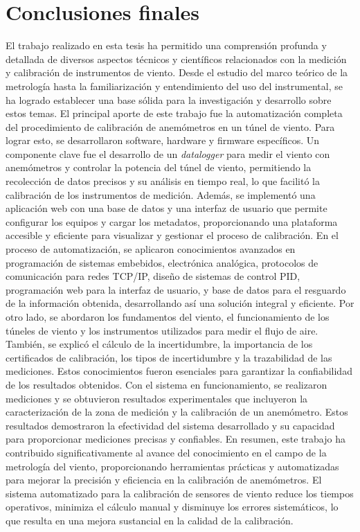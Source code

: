 \section{Conclusiones finales}
El trabajo realizado en esta tesis ha permitido una comprensión profunda y detallada de diversos aspectos técnicos y científicos relacionados con la medición y calibración de instrumentos de viento. Desde el estudio del marco teórico de la metrología hasta la familiarización y entendimiento del uso del instrumental, se ha logrado establecer una base sólida para la investigación y desarrollo sobre estos temas. El principal aporte de este trabajo fue la automatización completa del procedimiento de calibración de anemómetros en un túnel de viento. Para lograr esto, se desarrollaron software, hardware y firmware específicos. Un componente clave fue el desarrollo de un \textit{datalogger} para medir el viento con anemómetros y controlar la potencia del túnel de viento, permitiendo la recolección de datos precisos y su análisis en tiempo real, lo que facilitó la calibración de los instrumentos de medición. Además, se implementó una aplicación web con una base de datos y una interfaz de usuario que permite configurar los equipos y cargar los metadatos, proporcionando una plataforma accesible y eficiente para visualizar y gestionar el proceso de calibración. En el proceso de automatización, se aplicaron conocimientos avanzados en programación de sistemas embebidos, electrónica analógica, protocolos de comunicación para redes TCP/IP, diseño de sistemas de control PID, programación web para la interfaz de usuario, y base de datos para el resguardo de la información obtenida, desarrollando así una solución integral y eficiente. Por otro lado, se abordaron los fundamentos del viento, el funcionamiento de los túneles de viento y los instrumentos utilizados para medir el flujo de aire. También, se explicó el cálculo de la incertidumbre, la importancia de los certificados de calibración, los tipos de incertidumbre y la trazabilidad de las mediciones. Estos conocimientos fueron esenciales para garantizar la confiabilidad de los resultados obtenidos. Con el sistema en funcionamiento, se realizaron mediciones y se obtuvieron resultados experimentales que incluyeron la caracterización de la zona de medición y la calibración de un anemómetro. Estos resultados demostraron la efectividad del sistema desarrollado y su capacidad para proporcionar mediciones precisas y confiables. En resumen, este trabajo ha contribuido significativamente al avance del conocimiento en el campo de la metrología del viento, proporcionando herramientas prácticas y automatizadas para mejorar la precisión y eficiencia en la calibración de anemómetros. El sistema automatizado para la calibración de sensores de viento reduce los tiempos operativos, minimiza el cálculo manual y disminuye los errores sistemáticos, lo que resulta en una mejora sustancial en la calidad de la calibración.

